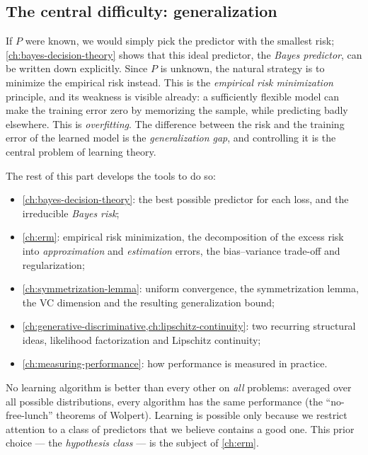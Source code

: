 \begin{notechapter}
\section{The central difficulty: generalization}\label{learning-problem:sec:roadmap}

If $P$ were known, we would simply pick the predictor with the smallest risk;
\cref{ch:bayes-decision-theory} shows that this ideal predictor, the
\emph{Bayes predictor}, can be written down explicitly. Since $P$ is unknown,
the natural strategy is to minimize the empirical risk instead. This is the
\emph{empirical risk minimization} principle, and its weakness is visible
already: a sufficiently flexible model can make the training error zero by
memorizing the sample, while predicting badly elsewhere. This is
\emph{overfitting}. The difference between the risk and the training error of
the learned model is the \emph{generalization gap}, and controlling it is the
central problem of learning theory.

The rest of this part develops the tools to do so:
\begin{itemize}
  \item \cref{ch:bayes-decision-theory}: the best possible predictor for each
        loss, and the irreducible \emph{Bayes risk};
  \item \cref{ch:erm}: empirical risk minimization, the decomposition of the
        excess risk into \emph{approximation} and \emph{estimation} errors,
        the bias--variance trade-off and regularization;
  \item \cref{ch:symmetrization-lemma}: uniform convergence, the
        symmetrization lemma, the VC dimension and the resulting
        generalization bound;
  \item \cref{ch:generative-discriminative,ch:lipschitz-continuity}:
        two recurring structural ideas, likelihood factorization and
        Lipschitz continuity;
  \item \cref{ch:measuring-performance}: how performance is measured in
        practice.
\end{itemize}

\begin{keyidea}
No learning algorithm is better than every other on \emph{all} problems: averaged
over all possible distributions, every algorithm has the same performance
(the ``no-free-lunch'' theorems of Wolpert). Learning is possible only because
we restrict attention to a class of predictors that we believe contains a
good one. This prior choice --- the \emph{hypothesis class} --- is the
subject of \cref{ch:erm}.
\end{keyidea}


\end{notechapter}
